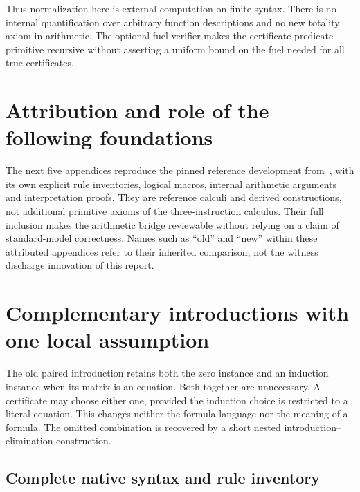 \documentclass[11pt,letterpaper]{article}
\theoremstyle{definition}\newtheorem{definition}[theorem]{Definition}
\theoremstyle{remark}\newtheorem{remark}[theorem]{Remark}
\begin{document}
Thus normalization here is external computation on finite syntax. There
is no internal quantification over arbitrary function descriptions and no
new totality axiom in arithmetic. The optional fuel verifier makes the
certificate predicate primitive recursive without asserting a uniform
bound on the fuel needed for all true certificates.

\clearpage
\section*{Attribution and role of the following foundations}
The next five appendices reproduce the pinned reference development
from~\cite{choice,erasure,forward,progress}, with its own explicit rule
inventories, logical macros, internal arithmetic arguments and interpretation
proofs. They are reference calculi and derived constructions, not additional
primitive axioms of the three-instruction calculus. Their full inclusion
makes the arithmetic bridge reviewable without relying on a claim of
standard-model correctness. Names such as ``old'' and ``new'' within these
attributed appendices refer to their inherited comparison, not the witness
discharge innovation of this report.



\section{Complementary introductions with one local assumption}
\label{sec:choice-introduction}

The old paired introduction retains both the zero instance and an
induction instance when its matrix is an equation. Both together are
unnecessary. A certificate may choose either one, provided the induction
choice is restricted to a literal equation. This changes neither the
formula language nor the meaning of a formula. The omitted combination
is recovered by a short nested introduction--elimination construction.

\subsection{Complete native syntax and rule inventory}
\end{document}
